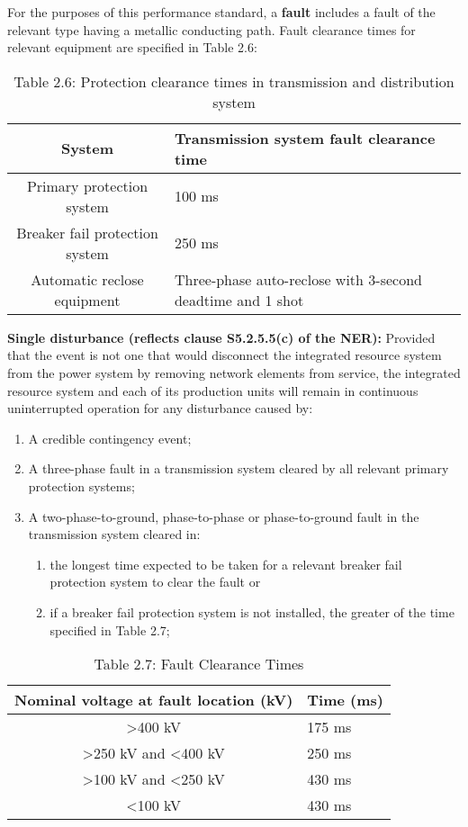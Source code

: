 For the purposes of this performance standard, a \textbf{fault} includes a fault of the relevant type having a metallic conducting path. 
Fault clearance times for relevant equipment are specified in Table 2.6:

	\begin{table}[H]
	\centering
	\begin{tabular}{|c|p{8cm}|}
		\hline
		\textbf{System} & \textbf Transmission system fault clearance time \\ \hline
		Primary protection system & 100 ms \\ \hline
		Breaker fail protection system & 250 ms \\ \hline
		Automatic reclose equipment & 
		Three-phase auto-reclose with 3-second deadtime and 1 shot \\ \hline
	\end{tabular}
	\caption*{Table 2.6: Protection clearance times in transmission and distribution system}
	\end{table}

\textbf{Single disturbance (reflects clause S5.2.5.5(c) of the NER):}  
Provided that the event is not one that would disconnect the integrated resource system from the power system by removing network elements from service, the integrated resource system and each of its production units will remain in continuous uninterrupted operation for any disturbance caused by:
\begin{enumerate}
	\item A credible contingency event;
	\item A three-phase fault in a transmission system cleared by all relevant primary protection systems;
	\item A two-phase-to-ground, phase-to-phase or phase-to-ground fault in the transmission system cleared in:
	\begin{enumerate}
		\item the longest time expected to be taken for a relevant breaker fail protection system to clear the fault or
		\item if a breaker fail protection system is not installed, the greater of the time specified in Table 2.7;
	\end{enumerate}
\end{enumerate}
		
		\begin{table}[H]
		\centering
		\begin{tabular}{|c|p{8cm}|}
			\hline
			\textbf{Nominal voltage at fault location (kV)} & \textbf{Time (ms)} \\ \hline
			>400 kV & 175 ms \\ \hline
			>250 kV and <400 kV & 250 ms \\ \hline
			>100 kV and <250 kV & 430 ms \\ \hline
			<100 kV & 430 ms \\ \hline
		\end{tabular}
		\caption*{Table 2.7: Fault Clearance Times}
		\end{table}

